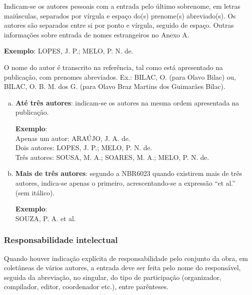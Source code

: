 Indicam-se os autores pessoais com a entrada pelo último sobrenome, em letras maiúsculas, separados por vírgula e espaço do(s) prenome(s) abreviado(s). Os autores são separados entre si por ponto e vírgula, seguido de espaço. Outras informações sobre entrada de nomes estrangeiros no Anexo A.

\begin{exemplomanual}
\textbf{Exemplo}:
LOPES, J. P.; MELO, P. N. de.
\end{exemplomanual}

O nome do autor é transcrito na referência, tal como está apresentado na publicação, com prenomes abreviados. Ex.: BILAC, O. (para Olavo Bilac) ou, BILAC, O. B. M. dos G. (para Olavo Braz Martins dos Guimarães Bilac).

\begin{enumerate}[a)]
  \item  \textbf{Até três autores}: indicam-se os autores na mesma ordem apresentada na publicação.

\begin{exemplomanuallista}
\textbf{Exemplo}:\\
Apenas um autor: ARAÚJO, J. A. de.\\
Dois autores: LOPES, J. P.; MELO, P. N. de.\\
Três autores: SOUSA, M. A.; SOARES, M. A.; MELO, P. N. de.
\end{exemplomanuallista}
  
  \item  \textbf{Mais de três autores}: segundo a NBR6023 \cite{NBR6023:2002} quando existirem mais de três autores, indica-se apenas o primeiro, acrescentando-se a expressão ``et al.'' (sem itálico).

  \begin{exemplomanuallista}
  \textbf{Exemplo}:\\
  SOUZA, P. A. et al.
  \end{exemplomanuallista}
\end{enumerate}


\subsubsection{Responsabilidade intelectual}

Quando houver indicação explícita de responsabilidade pelo conjunto da obra, em coletâneas de vários autores, a entrada deve ser feita pelo nome do responsável, seguida da abreviação, no singular, do tipo de participação (organizador, compilador, editor, coordenador etc.), entre parênteses.

